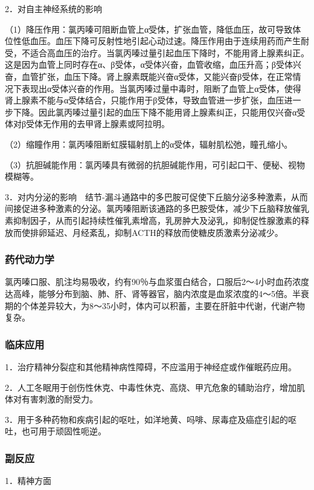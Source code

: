 2．对自主神经系统的影响

（1）降压作用：氯丙嗪可阻断血管上α受体，扩张血管，降低血压，故可导致体位性低血压。血压下降可反射性地引起心动过速。降压作用由于连续用药而产生耐受，不适合高血压的治疗。当氯丙嗪过量引起血压下降时，不能用肾上腺素纠正。这是因为血管上同时存在α、β受体，α受体兴奋，血管收缩，血压升高；β受体兴奋，血管扩张，血压下降。肾上腺素既能兴奋α受体，又能兴奋β受体，在正常情况下表现出α受体兴奋的作用。当氯丙嗪过量中毒时，阻断了血管上α受体，使得肾上腺素不能与α受体结合，只能作用于β受体，导致血管进一步扩张，血压进一步下降。因此氯丙嗪过量引起的血压下降不能用肾上腺素纠正，只能用仅兴奋α受体对β受体无作用的去甲肾上腺素或阿拉明。

（2）缩瞳作用：氯丙嗪阻断虹膜辐射肌上的α受体，辐射肌松弛，瞳孔缩小。

（3）抗胆碱能作用：氯丙嗪具有微弱的抗胆碱能作用，可引起口干、便秘、视物模糊等。

3．对内分泌的影响　结节-漏斗通路中的多巴胺可促使下丘脑分泌多种激素，从而间接促进多种激素的分泌。氯丙嗪阻断该通路的多巴胺受体，减少下丘脑释放催乳素抑制因子，从而引起持续性催乳素增高，乳房肿大及泌乳，抑制促性腺激素的释放而使排卵延迟、月经紊乱，抑制ACTH的释放而使糖皮质激素分泌减少。

\subsubsection{药代动力学}

氯丙嗪口服、肌注均易吸收，约有90％与血浆蛋白结合，口服后2～4小时血药浓度达高峰，能够分布到脑、肺、肝、肾等器官，脑内浓度是血浆浓度的4～5倍。半衰期的个体差异较大，为8～35小时，体内可以积蓄，主要在肝脏中代谢，代谢产物复杂。

\subsubsection{临床应用}

1．治疗精神分裂症和其他精神病性障碍，不应滥用于神经症或作催眠药应用。

2．人工冬眠用于创伤性休克、中毒性休克、高烧、甲亢危象的辅助治疗，增加肌体对有害刺激的耐受力。

3．用于多种药物和疾病引起的呕吐，如洋地黄、吗啡、尿毒症及癌症引起的呕吐，也可用于顽固性呃逆。

\subsubsection{副反应}

1．精神方面

